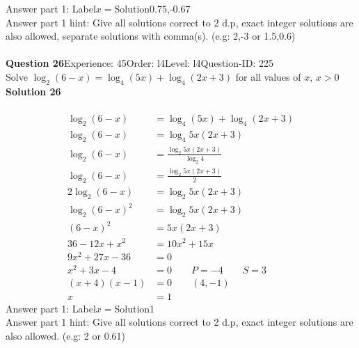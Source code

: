 \documentclass{article}
\begin{document}
Answer part 1: \hspace{10pt}Label\hspace{10pt}$x=$\hspace{10pt}Solution\hspace{10pt}0.75,-0.67\\
Answer part 1 hint: \hspace{15pt}Give all solutions correct to 2 d.p, exact integer solutions are also allowed, separate solutions with comma(s). (e.g: 2,-3 or 1.5,0.6)\\
\\[4pt]
\noindent\textbf{Question 26}\hspace{20pt}Experience: 45\hspace{20pt}Order: l4\hspace{20pt}Level: l4\hspace{20pt}Question-ID: 225\\[2pt]
Solve $\log_{2}(6-x)=\log_{4}(5x)+\log_{4}(2x+3)$ for all values of $x$, $x>0$\\[4pt]
\noindent\textbf{Solution 26}\\[2pt]
\\[-35pt]\begin{align*}
\log_{2}(6-x)&=\log_{4}(5x)+\log_{4}(2x+3)\\[2pt]
\log_{2}(6-x)&=\log_{4}5x(2x+3)\\[2pt]
\log_{2}(6-x)&=\displaystyle\frac{\log_{2}5x(2x+3)}{\log_{2}4}\\[2pt]
\log_{2}(6-x)&=\displaystyle\frac{\log_{2}5x(2x+3)}{2}\\[2pt]
2\log_{2}(6-x)&=\log_{2}5x(2x+3)\\[2pt]
\log_{2}(6-x)^2&=\log_{2}5x(2x+3)\\[2pt]
(6-x)^2&=5x(2x+3)\\[2pt]
36-12x+x^2&=10x^2+15x\\[2pt]
9x^2+27x-36&=0\\[2pt]
x^2+3x-4&=0\qquad P=-4 \qquad S=3\\[2pt]
(x+4)(x-1)&=0 \qquad (4,-1)\\[2pt]
x&=1
\end{align*}
Answer part 1: \hspace{10pt}Label\hspace{10pt}$x=$\hspace{10pt}Solution\hspace{10pt}1\\
Answer part 1 hint: \hspace{15pt}Give all solutions correct to 2 d.p, exact integer solutions are also allowed. (e.g: 2 or 0.61)\\
\end{document}
